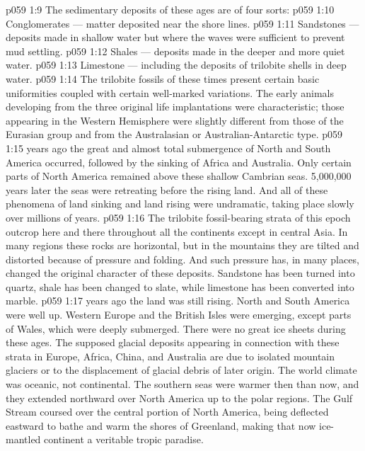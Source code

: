 \vs p059 1:9 \pc The sedimentary deposits of these ages are of four sorts:
\vs p059 1:10 \bibnobreakspace Conglomerates --- matter deposited near the shore lines.
\vs p059 1:11 \bibnobreakspace Sandstones --- deposits made in shallow water but where the waves were sufficient to prevent mud settling.
\vs p059 1:12 \bibnobreakspace Shales --- deposits made in the deeper and more quiet water.
\vs p059 1:13 \bibnobreakspace Limestone --- including the deposits of trilobite shells in deep water.
\vs p059 1:14 \pc The trilobite fossils of these times present certain basic uniformities coupled with certain well\hyp{}marked variations. The early animals developing from the three original life implantations were characteristic; those appearing in the Western Hemisphere were slightly different from those of the Eurasian group and from the Australasian or Australian\hyp{}Antarctic type.
\vs p059 1:15 \pc {} years ago the great and almost total submergence of North and South America occurred, followed by the sinking of Africa and Australia. Only certain parts of North America remained above these shallow Cambrian seas. 5,000,000 years later the seas were retreating before the rising land. And all of these phenomena of land sinking and land rising were undramatic, taking place slowly over millions of years.
\vs p059 1:16 The trilobite fossil\hyp{}bearing strata of this epoch outcrop here and there throughout all the continents except in central Asia. In many regions these rocks are horizontal, but in the mountains they are tilted and distorted because of pressure and folding. And such pressure has, in many places, changed the original character of these deposits. Sandstone has been turned into quartz, shale has been changed to slate, while limestone has been converted into marble.
\vs p059 1:17 \pc {} years ago the land was still rising. North and South America were well up. Western Europe and the British Isles were emerging, except parts of Wales, which were deeply submerged. There were no great ice sheets during these ages. The supposed glacial deposits appearing in connection with these strata in Europe, Africa, China, and Australia are due to isolated mountain glaciers or to the displacement of glacial debris of later origin. The world climate was oceanic, not continental. The southern seas were warmer then than now, and they extended northward over North America up to the polar regions. The Gulf Stream coursed over the central portion of North America, being deflected eastward to bathe and warm the shores of Greenland, making that now ice\hyp{}mantled continent a veritable tropic paradise.
